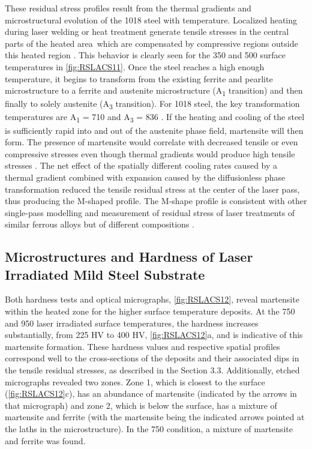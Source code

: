 		These residual stress profiles result from the thermal gradients and microstructural evolution of the 1018 steel with temperature. Localized heating during laser welding or heat treatment generate tensile stresses in the central parts of the heated area\ which are  compensated by compressive regions outside this heated region \cite{RN828,RN2261}. This behavior is clearly seen for the 350 \celsius{} and 500 \celsius{} surface temperatures in \ref{fig:RSLACS11}. Once the steel reaches a high enough temperature, it begins to transform from the existing ferrite and pearlite microstructure to a ferrite and austenite microstructure (A\textsubscript{1} transition) and then finally to solely austenite (A\textsubscript{3} transition). For 1018 steel, the key transformation temperatures are A\textsubscript{1} = 710 \celsius{} and A\textsubscript{3} = 836 \celsius{} \cite{RN1398}. If the heating and cooling of the steel is sufficiently rapid into and out of the austenite phase field, martensite will then form. The presence of martensite would correlate with decreased tensile or even compressive stresses even though thermal gradients would produce high tensile stresses \cite{RN1401}. The net effect of the spatially different cooling rates caused by a thermal gradient combined with expansion caused by the diffusionless phase transformation reduced the tensile residual stress at the center of the laser pass, thus producing the M-shaped profile. The M-shape profile is consistent with other single-pass modelling and measurement of residual stress of laser treatments of similar ferrous alloys but of different compositions \cite{RN2261,RN1155,RN1399}. 
	
	
	\subsection*{Microstructures and Hardness of Laser Irradiated Mild Steel Substrate}
	
	
		Both hardness tests and optical micrographs, \ref{fig:RSLACS12}, reveal martensite within the heated zone for the higher surface temperature deposits. At the 750 \celsius{} and 950 \celsius{} laser irradiated surface temperatures, the hardness increases substantially, from 225 HV to 400 HV, \ref{fig:RSLACS12}a, and is indicative of this martensite formation. These hardness values and respective spatial profiles correspond well to the cross-sections of the deposits and their associated dips in the tensile residual stresses, as described in the Section 3.3. Additionally, etched micrographs revealed two zones. Zone 1, which is closest to the surface (\ref{fig:RSLACS12}c), has an abundance of martensite (indicated by the arrows in that micrograph) and zone 2, which is below the surface, has a mixture of martensite and ferrite (with the martensite being the indicated arrows pointed at the laths in the microstructure). In the 750 \celsius{} condition, a mixture of martensite and ferrite was found. 
		

